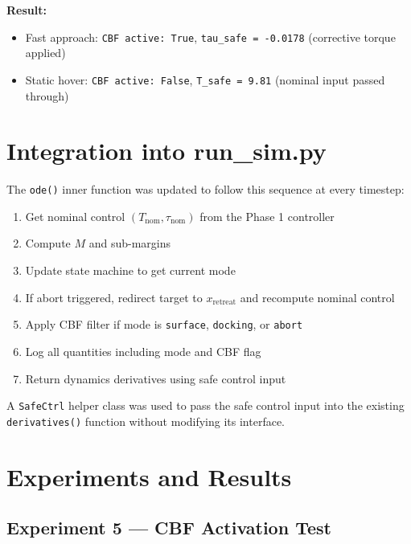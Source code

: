 \documentclass[12pt]{article}
\begin{document}
\textbf{Result:}
\begin{itemize}
    \item Fast approach: \texttt{CBF active: True},
          \texttt{tau\_safe = -0.0178} (corrective torque applied)
    \item Static hover: \texttt{CBF active: False},
          \texttt{T\_safe = 9.81} (nominal input passed through)
\end{itemize}

\section{Integration into run\_sim.py}

The \texttt{ode()} inner function was updated to follow this sequence
at every timestep:

\begin{enumerate}
    \item Get nominal control $(T_\mathrm{nom}, \tau_\mathrm{nom})$
          from the Phase 1 controller
    \item Compute $M$ and sub-margins
    \item Update state machine to get current mode
    \item If abort triggered, redirect target to
          $x_\mathrm{retreat}$ and recompute nominal control
    \item Apply CBF filter if mode is \texttt{surface},
          \texttt{docking}, or \texttt{abort}
    \item Log all quantities including mode and CBF flag
    \item Return dynamics derivatives using safe control input
\end{enumerate}

A \texttt{SafeCtrl} helper class was used to pass the safe control
input into the existing \texttt{derivatives()} function without
modifying its interface.

\section{Experiments and Results}

\subsection{Experiment 5 --- CBF Activation Test}
\end{document}

